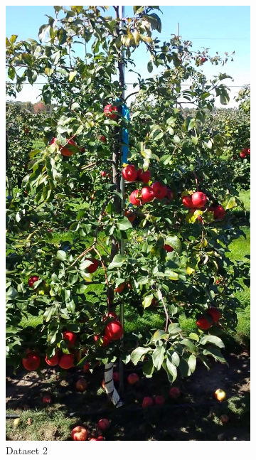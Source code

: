 \begin{figure}[ht]
\begin{subfigure}[b]{0.22\textwidth}
        \includegraphics[width=\textwidth]{figures/detection/dataset3.jpg}
        \caption{Dataset 2}
        \label{fig:validb}
    \end{subfigure}\hspace{.2cm}\begin{subfigure}[b]{0.22\textwidth}

\end{subfigure}
\end{figure}
